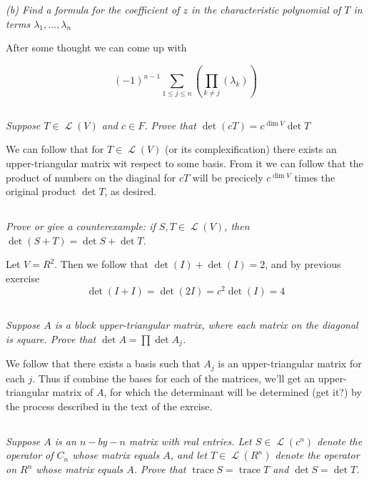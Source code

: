 \documentclass[11pt,oneside,titlepage]{book}
\DeclareMathOperator \map {\mathcal {L}}
\DeclareMathOperator \trace {trace}
\begin{document}
\textit{(b) Find a formula for the coefficient of $z$ in the characteristic polynomial
  of $T$ in terms $\lambda_1, ..., \lambda_n$}

After some thought we can come up with

$$(-1)^{n - 1} \sum_{1 \leq j \leq n}{\left(\prod_{k \neq j}(\lambda_k)\right)}$$

\subsection{}

\textit{Suppose $T \in \map(V)$ and $c \in F$. Prove that $\det(cT) = c^{\dim V} \det T$}

We can follow that for $T \in \map(V)$ (or its complexification) there exists an
upper-triangular matrix wit respect to some basis. From it we can follow  that the
product of numbers on the diaginal for $cT$ will be precicely $c^{\dim V}$ times
the original product $\det T$, as desired.\

\subsection{}

\textit{Prove or give a counterexample: if $S, T \in \map(V)$, then $\det (S + T) =
  \det S + \det T$.}

Let $V = R^2$. Then we follow that $\det(I) + \det(I) = 2$, and by previous exercise
$$\det (I + I) = \det (2I) = c^2 \det(I) = 4$$

\subsection{}

\textit{Suppose $A$ is a block upper-triangular matrix, where each matrix on the diagonal is square.
  Prove that $\det A = \prod{\det A_j}$. }

We follow that there exists a basis such that $A_j$ is an upper-triangular matrix for each $j$.
Thus if combine the bases for each of the matrices, we'll get an upper-triangular matrix of
$A$, for which the determinant will be determined (get it?) by the process described in the text of the
exrcise.

\subsection{}

\textit{Suppose $A$ is an $n-by-n$ matrix with real entries. Let $S \in \map(c^n)$ denote
  the operator of $C_n$ whose matrix equals $A$, and let $T \in \map(R^n)$ denote
  the operator on $R^n$ whose matrix equals $A$. Prove that $\trace S = \trace T$
  and $\det S = \det T$.}
\end{document}
